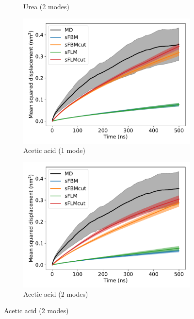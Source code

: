 \documentclass{article}
\begin{document}
\begin{figure}
\begin{subfigure}{0.45\textwidth}
  \caption{Urea (2 modes)}\label{fig:2mode_msd_comparison_URE_train_front}
  \end{subfigure}
  \begin{subfigure}{0.45\textwidth}
  \includegraphics[width=\textwidth]{1mode_msd_comparison_ACH_train_front.pdf}
  \caption{Acetic acid (1 mode)}\label{fig:1mode_msd_comparison_ACH_train_front}
  \end{subfigure}
  \begin{subfigure}{0.45\textwidth}
  \includegraphics[width=\textwidth]{2mode_msd_comparison_ACH_train_front.pdf}
  \caption{Acetic acid (2 modes)}\label{fig:2mode_msd_comparison_ACH_train_front}
  \end{subfigure} 

\end{figure}
\end{document}
